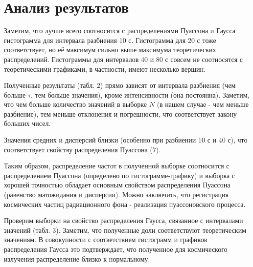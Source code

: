 \documentclass{report}
\begin{document}
	
	
	\section*{Анализ результатов}
		
	\hspace{4mm} Заметим, что лучше всего соотносится с распределениями Пуассона и Гаусса гистограмма для интервала разбиения 10 с. Гистограмма для 20 с тоже соответствует, но её максимум сильно выше максимума теоретических распределений. Гистограммы для интервалов 40 и 80 с совсем не соотносятся с теоретическими графиками, в частности, имеют несколько вершин.
	
	Полученные результаты (табл. 2) прямо зависят от интервала разбиения (чем больше $\tau$, тем больше значения), кроме интенсивности (она постоянна). Заметим, что чем больше количество значений в выборке $N$ (в нашем случае - чем меньше разбиение), тем меньше отклонения и погрешности, что соответствует закону больших чисел.
	
	Значения средних и дисперсий близки (особенно при разбиении 10 с и 40 с), что соответствует свойству распределения Пуассона (7).
	
	Таким образом, распределение частот в полученной выборке соотносится с распределением Пуассона (определено по гистограмме-графику) и выборка с хорошей точностью обладает основным свойством распределения Пуассона (равенство матожидания и дисперсии). Можно заключить, что регистрация космических частиц радиационного фона - реализация пуассоновского процесса.
	
	Проверим выборки на свойство распределения Гаусса, связанное с интервалами значений (табл. 3). Заметим, что полученные доли соответствуют теоретическим значениям. В совокупности с соответствием гистограмм и графиков распределения Гаусса это подтверждает, что полученное для космического излучения распределение близко к нормальному.
	
	\begin{table}[h]
		\centering
	\end{table}
	
\end{document}
